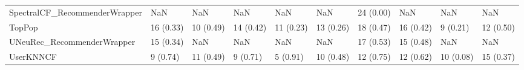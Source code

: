 \begin{tabular}{llllllllll}
      SpectralCF\_RecommenderWrapper &                      NaN &         NaN &           NaN &          NaN &                  NaN &           24 (0.00) &               NaN &                NaN &               NaN \\
                             TopPop &                16 (0.33) &   10 (0.49) &     14 (0.42) &    11 (0.23) &            13 (0.26) &           18 (0.47) &         16 (0.42) &           9 (0.21) &         12 (0.50) \\
         UNeuRec\_RecommenderWrapper &                15 (0.34) &         NaN &           NaN &          NaN &                  NaN &           17 (0.53) &         15 (0.48) &                NaN &               NaN \\
                          UserKNNCF &                 9 (0.74) &   11 (0.49) &      9 (0.71) &     5 (0.91) &            10 (0.48) &           12 (0.75) &         12 (0.62) &          10 (0.08) &         15 (0.37) \\
\bottomrule
\end{tabular}
